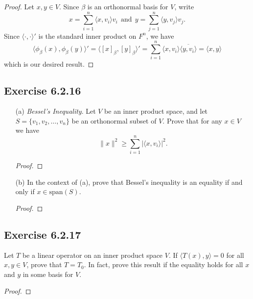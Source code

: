 \begin{enumerate}
        \begin{proof}
            Let \( x,y \in V  \). Since \( \beta  \) is an orthonormal basis for \( V  \), write
        \[   x = \sum_{ i=1  }^{ n } \langle x , {v}_{i} \rangle {v}_{i} \ \ \text{and} \ \ y = \sum_{ j=1  }^{ n  } \langle y , {v}_{j} \rangle {v}_{j}. \]
        Since \( \langle \cdot , \cdot \rangle'  \) is the standard inner product on \( F^{n} \), we have
        \[  \langle \phi_{\beta}(x) , {\phi}_{\beta}(y)  \rangle' = \langle [x]_{\beta} , [y]_{\beta} \rangle' = \sum_{ i=1  }^{ n } \langle x , {v}_{i} \rangle \overline{\langle y , {v}_{i} \rangle} = \langle x , y \rangle \]
        which is our desired result.
        \end{proof}
\end{enumerate}

\subsection*{Exercise 6.2.16}
\begin{enumerate}
    \item[(a)] \textit{Bessel's Inequality}. Let \( V  \) be an inner product space, and let \( S = \{ {v}_{1}, {v}_{2}, \dots, {v}_{n} \}  \) be an orthonormal subset of \( V  \). Prove that for any \( x \in V  \) we have 
        \[  \|x\|^{2} \geq \sum_{ i=1  }^{ n } | \langle x , {v}_{i} \rangle |^{2}. \]
        \begin{proof}
        
        \end{proof}
    \item[(b)] In the context of (a), prove that Bessel's inequality is an equality if and only if \( x \in \text{span}(S) \).
        \begin{proof}
        
        \end{proof}
\end{enumerate}

\subsection*{Exercise 6.2.17} Let \( T  \) be a linear operator on an inner product space \( V  \). If \( \langle T(x) , y \rangle = 0  \) for all \( x,y \in V  \), prove that \( T = {T}_{0} \). In fact, prove this result if the equality holds for all \( x  \) and \( y  \) in some basis for \( V  \).
\begin{proof}

\end{proof}
